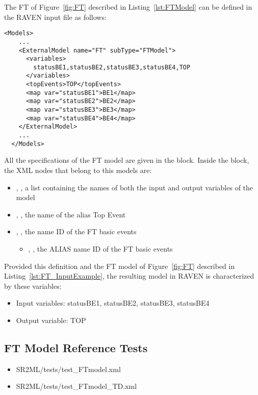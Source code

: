 The FT of Figure~\ref{fig:FT} described in Listing~\ref{lst:FTModel} can be defined in the RAVEN input file as follows:

\begin{lstlisting}[style=XML,morekeywords={anAttribute},caption=FT model input example., label=lst:FT_InputExample]
  <Models>
    ...
    <ExternalModel name="FT" subType="FTModel">
      <variables>
        statusBE1,statusBE2,statusBE3,statusBE4,TOP
      </variables>
      <topEvents>TOP</topEvents>
      <map var="statusBE1">BE1</map>
      <map var="statusBE2">BE2</map>
      <map var="statusBE3">BE3</map>
      <map var="statusBE4">BE4</map>
    </ExternalModel>
    ...
  </Models>
\end{lstlisting}

All the specifications of the FT model are given in the
 block.
Inside the  block, the XML
nodes that belong to this models are:
\begin{itemize}
  \item  {}, , a list containing the names of both the input and output variables of the model
  \item  {}, , the name of the alias Top Event
  \item  {}, , the name ID of the FT basic events
	  \begin{itemize}
	    \item {}, , the ALIAS name ID of the FT basic events
	  \end{itemize}
\end{itemize}

Provided this definition and the FT model of Figure~\ref{fig:FT} described in Listing~\ref{lst:FT_InputExample},
the resulting model in RAVEN is characterized by these variables:
\begin{itemize}
	\item Input variables: statusBE1, statusBE2, statusBE3, statusBE4
	\item Output variable: TOP
\end{itemize}

\subsection{FT Model Reference Tests}
\begin{itemize}
	\item SR2ML/tests/test\_FTmodel.xml
	\item SR2ML/tests/test\_FTmodel\_TD.xml
\end{itemize}
